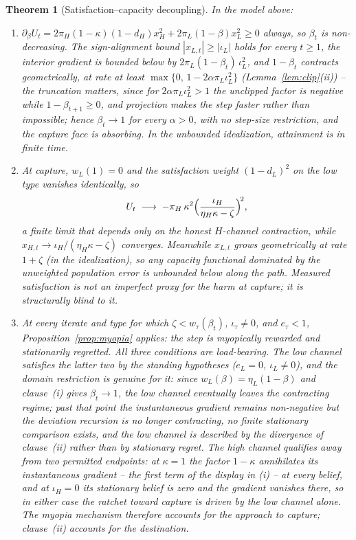 \documentclass[11pt]{article}
\newtheorem{theorem}{Theorem}[section]
\theoremstyle{definition}
\theoremstyle{remark}
\numberwithin{equation}{section}
\begin{document}
\begin{theorem}[Satisfaction--capacity decoupling]\label{thm:launder}
In the model above:
\begin{enumerate}
\item[(i)] $\partial_\beta U_t = 2\pi_H(1-\kappa)(1-d_H)x_H^2 + 2\pi_L(1-\beta)x_L^2 \ge 0$ always, so $\beta_t$ is non-decreasing. The sign-alignment bound $|x_{L,t}| \ge |\iota_L|$ holds for every $t \ge 1$, the interior gradient is bounded below by $2\pi_L(1-\beta_t)\,\iota_L^2$, and $1-\beta_t$ contracts geometrically, at rate at least $\max\{0,\,1 - 2\alpha\pi_L\iota_L^2\}$ (Lemma~\ref{lem:clip}(ii)) -- the truncation matters, since for $2\alpha\pi_L\iota_L^2 > 1$ the unclipped factor is negative while $1-\beta_{t+1} \ge 0$, and projection makes the step faster rather than impossible; hence $\beta_t \to 1$ for every $\alpha > 0$, with no step-size restriction, and the capture face is absorbing. In the unbounded idealization, attainment is in finite time.
\item[(ii)] At capture, $w_L(1) = 0$ and the satisfaction weight $(1-d_L)^2$ on the low type vanishes \emph{identically}, so
\[
U_t \;\longrightarrow\; -\pi_H\,\kappa^2\Bigl(\frac{\iota_H}{\eta_H\kappa - \zeta}\Bigr)^{\!2},
\]
a finite limit that depends only on the honest $H$-channel contraction, while $x_{H,t} \to \iota_H/(\eta_H\kappa - \zeta)$ converges. Meanwhile $x_{L,t}$ grows geometrically at rate $1+\zeta$ (in the idealization), so any capacity functional dominated by the unweighted population error is unbounded below along the path. Measured satisfaction is not an imperfect proxy for the harm at capture; it is structurally blind to it.
\item[(iii)] At every iterate and type for which $\zeta < w_\tau(\beta_t)$, $\iota_\tau \neq 0$, and $e_\tau < 1$, Proposition~\ref{prop:myopia} applies: the step is myopically rewarded and stationarily regretted. All three conditions are load-bearing. The low channel satisfies the latter two by the standing hypotheses ($e_L = 0$, $\iota_L \neq 0$), and the domain restriction is genuine for it: since $w_L(\beta) = \eta_L(1-\beta)$ and clause~(i) gives $\beta_t \to 1$, the low channel eventually leaves the contracting regime; past that point the instantaneous gradient remains non-negative but the deviation recursion is no longer contracting, no finite stationary comparison exists, and the low channel is described by the divergence of clause~(ii) rather than by stationary regret. The high channel qualifies away from two permitted endpoints: at $\kappa = 1$ the factor $1-\kappa$ annihilates its instantaneous gradient -- the first term of the display in (i) -- at every belief, and at $\iota_H = 0$ its stationary belief is zero and the gradient vanishes there, so in either case the ratchet toward capture is driven by the low channel alone. The myopia mechanism therefore accounts for the approach to capture; clause~(ii) accounts for the destination.
\end{enumerate}
\end{theorem}
\end{document}
